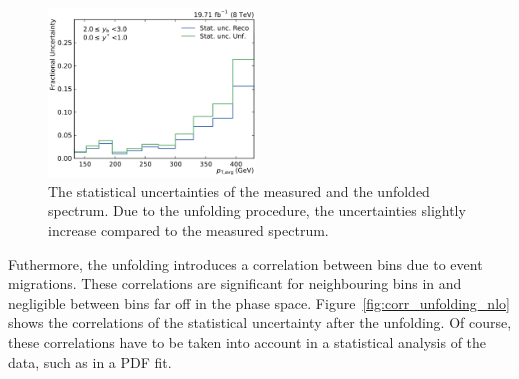 \begin{figure}[htbp]
    \includegraphics[width=0.49\textwidth]{figures/measurement/statunc_fractional_yb2ys0.pdf}
    \caption[Statistical uncertainty of measured and unfolded sprectrum]{The
    statistical uncertainties of the measured and the unfolded spectrum. Due to
    the unfolding procedure, the uncertainties slightly increase compared to the
    measured spectrum.}
    \label{fig:statunc_relative}
\end{figure}

Futhermore, the unfolding introduces a correlation between bins due to event
migrations. These correlations are significant for neighbouring bins in \pt and
negligible between bins far off in the phase space.
Figure~\ref{fig:corr_unfolding_nlo} shows the correlations of the statistical
uncertainty after the unfolding. Of course, these correlations have to be taken
into account in a statistical analysis of the data, such as in a PDF fit.

